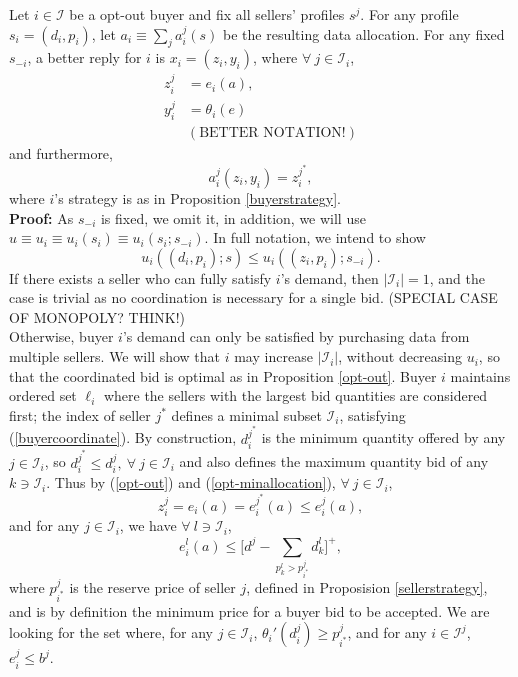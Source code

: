 \documentclass[12pt]{article}
\theoremstyle{definition}
\newcommand{\mcI}{\mathcal{I}}
\begin{document}
\begin{multicols}{2}
{
\label{coordinationlemma} 
Let $i\in\mcI$ be a opt-out buyer and fix all sellers' profiles $s^j$.
For any profile $s_i = (d_i, p_i)$, let $a_i \equiv \sum_j a_i^j(s)$ be the resulting data
allocation. For any fixed $s_{-i}$, a better reply for $i$ is $x_i =
(z_i,y_i)$, where $\forall \ j \in \mcI_i$,
\begin{align*}
    z_i^j &= e_i(a), \\
    y_i^j &= \theta_i(e) \\ &(\text{BETTER NOTATION!})
\end{align*}
and furthermore,
\begin{equation}\label{coordination}
    a_i^j(z_i,y_i) = z_i^{j^*},
\end{equation}
where $i$'s strategy is as in Proposition \ref{buyerstrategy}.
}\\
\textbf{Proof:}
As $s_{-i}$ is fixed, we omit it, in addition, we will use $u\equiv u_i \equiv u_i(s_i) \equiv
u_i(s_i;s_{-i})$. In full notation, we intend to show
$$
    u_i((d_i,p_i);s) \le u_i((z_i,p_i);s_{-i}).
$$
If there exists a seller who can fully satisfy $i$'s demand,
then $\vert\mcI_i\vert = 1$, and the case is trivial as no
coordination is necessary for a single bid. (SPECIAL CASE OF MONOPOLY? THINK!)\\
Otherwise, buyer $i$'s demand can only be satisfied by purchasing data from
multiple sellers.
We will show that $i$ may increase $\vert\mcI_i\vert$, without decreasing $u_i$,
so that the coordinated bid is optimal as in Proposition \ref{opt-out}. 
Buyer $i$ maintains ordered set $\ell_i$ where the sellers with the
largest bid quantities are considered first; the index of seller $j^*$ defines
a minimal subset $\mcI_i$, satisfying (\ref{buyercoordinate}). By construction, 
$d_i^{j^*}$ is the minimum quantity offered by any $j\in \mcI_i$,
so $d_i^{j^*} \le d_i^j, \ \forall \ j \in \mcI_i$ and also defines the
maximum quantity bid of any $k \ni \mcI_i$.
Thus by (\ref{opt-out}) and (\ref{opt-minallocation}), $\forall \ j\in \mcI_i$,
$$
    z_i^j = e_i(a) = e_i^{j^*}(a)  \le e_i^{j}(a),
$$
and for any $j\in\mcI_i$, we have $\forall \ l \ni \mcI_i$,
\begin{equation}\label{minimaleq}
e_i^{l}(a) 
     \le \bigg\lbrack d^{j} - \sum_{p_k^{l}> p_{i^*}^{j}} d_k^{l}\bigg\rbrack^+,
\end{equation}
where $p_{i^*}^j$ is the reserve price of seller $j$, defined in Proposision
\ref{sellerstrategy}, and is by definition the minimum price for a buyer bid to
be accepted. We are looking for the set where, for any $j\in\mcI_i$, $\theta_i'(d_i^j) \ge
p_{i^*}^j$, and for any $i\in\mcI^j$, $e_i^j \le b^j$.


\end{multicols}
\end{document}

